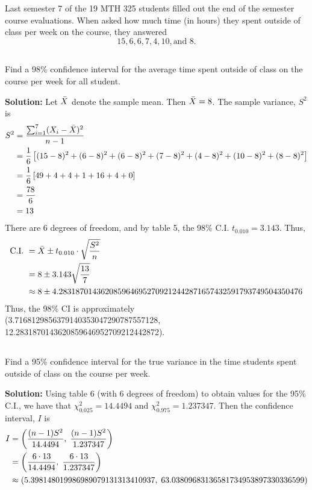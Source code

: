 \section{}
Last semester 7 of the 19 MTH 325 students filled out the end of the semester course evaluations.  When asked how much time (in hours) they spent outside of class per week on the course, they answered
\[
15, 6, 6, 7, 4, 10, \text{and } 8.
\]
\subsection{}
    Find a 98\% confidence interval for the average time spent outside of class on the course per week for all student.
    \begin{mybox}
        \textbf{Solution: } Let $\bar{X}$ denote the sample mean. Then $\bar{X} = 8$. The sample variance, $S^2$ is
        \begin{align}
            S^2 &= \frac{\sum_{i=1}^{7} (X_i - \bar{X})^2}{n-1}\notag\\
            &= \frac{1}{6}\left[ {(15-8)^2 + (6-8)^2 + (6-8)^2 + (7-8)^2 + (4-8)^2  + (10-8)^2 + (8-8)^2} \right]\notag\\
            &= \frac{1}{6}\left[ {49 + 4 + 4 + 1 + 16 + 4 + 0} \right]\notag\\
            &= \frac{78}{6}\notag\\
            &= 13\notag
        \end{align}
        There are 6 degrees of freedom, and by table 5, the 98\% C.I. $t_{0.010} = 3.143$. Thus,
        \begin{align}
            \text{C.I. } &= \bar{X} \pm t_{0.010} \cdot \sqrt{\frac{S^2}{n}}\notag\\
            &= 8 \pm 3.143 \sqrt{\frac{13}{7}} \notag\\
            &\approx 8 \pm 4.2831870143620859646952709212442871657432591793749504350476 \notag 
        \end{align}
        Thus, the 98\% CI is approximately \\(3.7168129856379140353047290787557128, 12.2831870143620859646952709212442872).
    \end{mybox}
    \newpage
\subsection{}
    Find a 95\% confidence interval for the true variance in the time students spent outside of class on the course per week.
    \begin{mybox}
        \textbf{Solution: } Using table 6 (with 6 degrees of freedom) to obtain values for the 95\% C.I., we have that $\chi^2_{0.025} = 14.4494$ and $\chi^2_{0.975} = 1.237347$. Then the confidence interval, $I$ is 
        \begin{align}
            I &= \left( {\frac{(n-1)S^2}{14.4494},\; \frac{(n-1)S^2}{1.237347}} \right)\notag\\
            &= \left( {\frac{6\cdot 13}{14.4494},\; \frac{6 \cdot 13}{1.237347}} \right)\notag\\
            &\approx \left( {5.398148019986989079131313410937,\;63.03809683136581734953897330336599 } \right)\notag
        \end{align}
    \end{mybox}